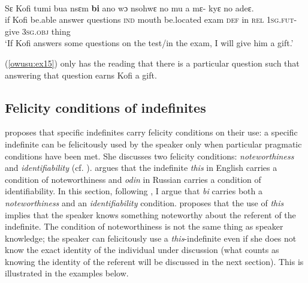 \documentclass[output=paper,modfonts,nonflat,draftmode]{langsci/langscibook}
\begin{document}
\ea\label{owusu:ex15} \\
\gll  Sε Kofi tumi bua nsεm \textbf{bi} ano wɔ nsohwε no mu a mε- kyε no adeε.\\
 if Kofi be.able answer questions \textsc{ind} mouth be.located exam \textsc{def} in \textsc{rel} \textsc{1sg.fut}- give \textsc{3sg}.\textsc{obj} thing \\
\glt `If Kofi answers some questions on the test/in the exam, I will give him a gift.'
\z 

(\ref{owusu:ex15}) only has the reading that there is a particular question such that answering that question earns Kofi a gift. 

\subsection{Felicity conditions of indefinites}

\citet{Ionin2006} proposes that specific indefinites carry felicity conditions on their use: a specific indefinite can be felicitously used by the speaker only when particular pragmatic conditions have been met. She discusses two felicity conditions: \emph{noteworthiness} and \emph{identifiability} (cf. \citealt{AbuschRooth1997,Farkas2002}). \citet{Ionin2013} argues that the indefinite \emph{this} in English carries a condition of noteworthiness and \emph{odin} in Russian carries a condition of identifiability. In this section, following \citet{Ionin2013}, I  argue that \emph{bi} carries both a \emph{noteworthiness} and an \emph{identifiability} condition. \citet{Ionin2006} proposes that the use of \emph{this} implies that the speaker knows something noteworthy about the referent of the indefinite. The condition of noteworthiness is not the same thing as speaker knowledge; the speaker can felicitously use a \emph{this}-indefinite even if she does not know the exact identity of the individual under discussion (what counts as knowing the identity of the referent will be discussed in the next section). This is illustrated in the examples below. 
\ea {}\\

 \label{owusu:ex18}

\label{owusu:ex19}
 \label{owusu:ex200}
\end{document}
